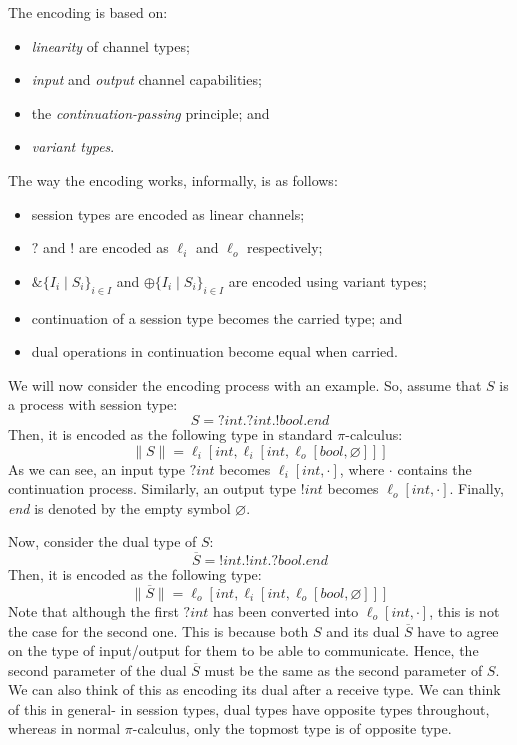 \documentclass[a4paper, openany]{memoir}
\theoremstyle{definition}
\begin{document}
    The encoding is based on:
    \begin{itemize}
        \item \emph{linearity} of channel types;
        \item \emph{input} and \emph{output} channel capabilities;
        \item the \emph{continuation-passing} principle; and
        \item \emph{variant types}.
    \end{itemize}
    The way the encoding works, informally, is as follows:
    \begin{itemize}
        \item session types are encoded as linear channels;
        \item $?$ and $!$ are encoded as $\ell_i$ and $\ell_o$ respectively;
        \item $\& \{I_i \mid S_i\}_{i \in I}$ and $\oplus \{I_i \mid S_i\}_{i \in I}$ are encoded using variant types;
        \item continuation of a session type becomes the carried type; and
        \item dual operations in continuation become equal when carried.
    \end{itemize}
    
    We will now consider the encoding process with an example. So, assume that $S$ is a process with session type:
    \[S = ?\textit{int}.?\textit{int}.!\textit{bool}.\textit{end}\]
    Then, it is encoded as the following type in standard $\pi$-calculus:
    \[\lVert S \rVert = \ell_i[\textit{int}, \ell_i[\textit{int}, \ell_o [\textit{bool}, \varnothing]]]\]
    As we can see, an input type $?\textit{int}$ becomes $\ell_i[\textit{int}, \cdot]$, where $\cdot$ contains the continuation process. Similarly, an output type $!\textit{int}$ becomes $\ell_o[\textit{int}, \cdot]$. Finally, \textit{end} is denoted by the empty symbol $\varnothing$.

    Now, consider the dual type of $S$:
    \[\overline{S} = !\textit{int}.!\textit{int}.?\textit{bool}.\textit{end}\]
    Then, it is encoded as the following type:
    \[\lVert \overline{S} \rVert = \ell_o[\textit{int}, \ell_i[\textit{int}, \ell_o[\textit{bool}, \varnothing]]]\]
    Note that although the first $?\textit{int}$ has been converted into $\ell_o[\textit{int}, \cdot]$, this is not the case for the second one. This is because both $S$ and its dual $\overline{S}$ have to agree on the type of input/output for them to be able to communicate. Hence, the second parameter of the dual $\overline{S}$ must be the same as the second parameter of $S$. We can also think of this as encoding its dual after a receive type. We can think of this in general- in session types, dual types have opposite types throughout, whereas in normal $\pi$-calculus, only the topmost type is of opposite type.
\end{document}

